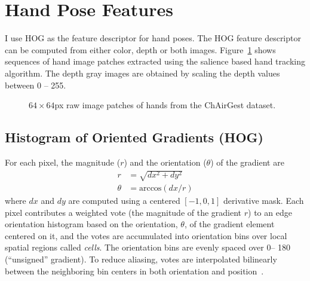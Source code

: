 
\section{Hand Pose Features}
I use HOG as the feature descriptor for hand poses. The HOG feature descriptor
can be computed from either color, depth or both images. Figure~\ref{fig:hand}
shows sequences of hand image patches extracted using the salience based hand
tracking algorithm. The depth gray images are obtained by scaling the depth
values between 0 -- 255.

\begin{figure}[tbh]
  \centering
  \caption{$64\times64$px raw image patches of hands from the ChAirGest
  dataset.}
  \label{fig:hand}
\end{figure}

\subsection{Histogram of Oriented Gradients (HOG)}
For each pixel, the magnitude ($r$) and the orientation ($\theta$) of the
gradient are
\begin{align*}
r &= \sqrt{dx^2 + dy^2} \\
\theta &= \text{arccos}(dx / r) 
\end{align*}
where $dx$ and $dy$ are computed using a centered $[-1, 0, 1]$ derivative mask.
Each pixel contributes a weighted vote (the magnitude of the gradient $r$) to an
edge orientation histogram based on the orientation, $\theta$, of the gradient
element centered on it, and the votes are accumulated into orientation bins over local spatial regions called
\textit{cells}.
The orientation bins are evenly spaced over 0\textdegree -- 180\textdegree
(``unsigned'' gradient). To reduce aliasing, votes are interpolated
bilinearly between the neighboring bin centers in both orientation and
position~\cite{dalal05}. 

